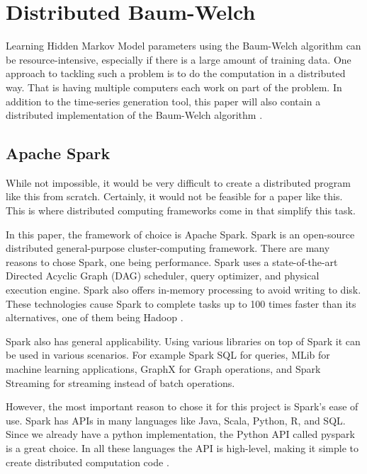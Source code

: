 
\chapter{Distributed Baum-Welch}\label{chapter:hmm-dist}

Learning Hidden Markov Model parameters using the Baum-Welch algorithm can be resource-intensive, especially if there is a large amount of training data. One approach to tackling such a problem is to do the computation in a distributed way. That is having multiple computers each work on part of the problem. In addition to the time-series generation tool, this paper will also contain a distributed implementation of the Baum-Welch algorithm \parencite{sparkhmm}. 

\section{Apache Spark}

While not impossible, it would be very difficult to create a distributed program like this from scratch. Certainly, it would not be feasible for a paper like this. This is where distributed computing frameworks come in that simplify this task. 

In this paper, the framework of choice is Apache Spark. Spark is an open-source distributed general-purpose cluster-computing framework. There are many reasons to chose Spark, one being performance. Spark uses a state-of-the-art Directed Acyclic Graph (DAG) scheduler, query optimizer, and physical execution engine. Spark also offers in-memory processing to avoid writing to disk. These technologies cause Spark to complete tasks up to 100 times faster than its alternatives, one of them being Hadoop \parencite{zaharia2016apache}.

Spark also has general applicability. Using various libraries on top of Spark it can be used in various scenarios. For example Spark SQL for queries, MLib for machine learning applications, GraphX for Graph operations, and Spark Streaming for streaming instead of batch operations. 

However, the most important reason to chose it for this project is Spark's ease of use. Spark has APIs in many languages like Java, Scala, Python, R, and SQL. Since we already have a python implementation, the Python API called pyspark is a great choice. In all these languages the API is high-level, making it simple to create distributed computation code \parencite{pyspark}.

